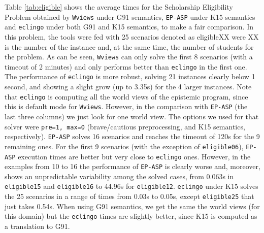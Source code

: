 \documentclass{new_tlp}
\def\eclingo{{\tt eclingo}}
\def\wviews{{\tt Wviews}}
\def\wviews{{\tt Wviews}}
\def\EPASP{{\tt EP-ASP}}
\begin{document}
Table \ref{tab:eligible} shows the average times for the Scholarship Eligibility Problem obtained by \wviews{} under G91 semantics, \EPASP{} under K15 semantics and \eclingo{} under both G91 and K15 semantics, to make a fair comparison. 
%
In this problem, the tools were fed with 25 scenarios denoted as eligibleXX were XX is the number of the instance and, at the same time, the number of students for the problem. 
%
As can be seen, \wviews{} can only solve the first 8 scenarios (with a timeout of 2 minutes) and only performs better than \eclingo{} in the first one. 
%
The performance of \eclingo{} is more robust, solving 21 instances clearly below 1 second, and showing a slight grow (up to 3.35s) for the 4 larger instances.
%
Note that \eclingo{} is computing all the world views of the epistemic program, since this is default mode for \wviews{}.
%
However, in the comparison with \EPASP{} (the last three columns) we just look for one world view.
%
The options we used for that solver were {\tt  pre=1, max=0} (brave/cautious preprocessing, and K15 semantics, respectively).
%
\EPASP{} solves 16 scenarios and reaches the timeout of 120s for the 9 remaining ones. For the first 9 scenarios (with the exception of {\tt eligible06}), \EPASP{} execution times are better but very close to \eclingo{} ones. However, in the examples from 10 to 16 the performance of \EPASP{} is clearly worse and, moreover, shows an unpredictable variability among the solved cases, from 0.063s in {\tt eligible15} and {\tt eligible16} to 44.96s for {\tt eligible12}. \eclingo{} under K15 solves the 25 scenarios in a range of times from 0.03s to 0.05s, except {\tt eligible25} that just takes 0.54s.
When using G91 semantics, we get the same the world views (for this domain) but the \eclingo{} times are slightly better, since K15 is computed as a translation to G91.
\end{document}
